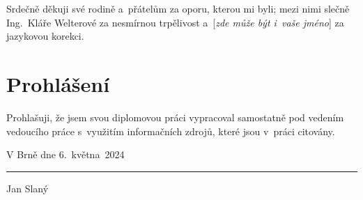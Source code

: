 Srdečně děkuji své rodině a~přátelům za oporu, kterou mi byli;
mezi nimi slečně Ing.~Kláře Welterové za nesmírnou trpělivost
a~[\emph{zde může být i~vaše jméno}] za jazykovou korekci.
\vfill

{\let\clearpage\relax\chapter*{Prohlášení}}
\thispagestyle{empty}
Prohlašuji, že jsem svou diplomovou práci vypracoval samostatně
pod vedením vedoucího práce s~využitím informačních zdrojů,
které jsou v~práci citovány.
\bigskip

\noindent
V Brně dne 6.~května~2024
\hfill
\parbox{6cm}{
	\centering
	\vspace{1.5cm}
	\rule{6cm}{0.1pt}\par
	Jan Slaný
}
